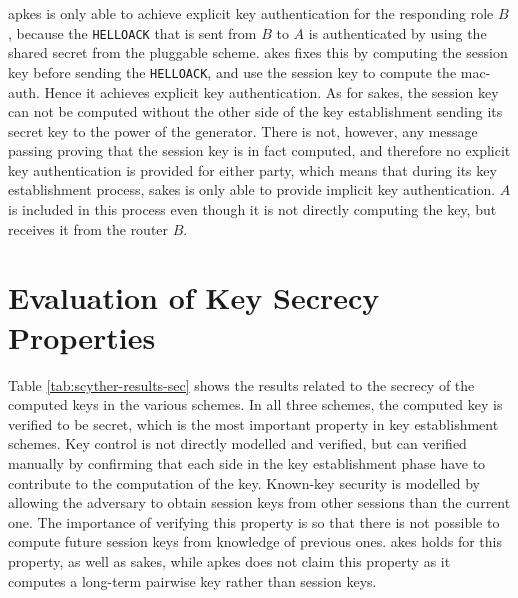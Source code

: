 \gls{apkes} is only able to achieve explicit key authentication for the responding role $B$, because the \texttt{HELLOACK} that is sent from $B$ to $A$ is authenticated by using the shared secret from the pluggable scheme. \gls{akes} fixes this by computing the session key before sending the \texttt{HELLOACK}, and use the session key to compute the \gls{mac-auth}. Hence it achieves explicit key authentication. As for \gls{sakes}, the session key can not be computed without the other side of the key establishment sending its secret key to the power of the generator. There is not, however, any message passing proving that the session key is in fact computed, and therefore no explicit key authentication is provided for either party, which means that during its key establishment process, \gls{sakes} is only able to provide implicit key authentication. $A$ is included in this process even though it is not directly computing the key, but receives it from the router $B$.

\section{Evaluation of Key Secrecy Properties}

Table \ref{tab:scyther-results-sec} shows the results related to the secrecy of the computed keys in the various schemes. In all three schemes, the computed key is verified to be secret, which is the most important property in key establishment schemes. Key control is not directly modelled and verified, but can verified manually by confirming that each side in the key establishment phase have to contribute to the computation of the key. Known-key security is modelled by allowing the adversary to obtain session keys from other sessions than the current one. The importance of verifying this property is so that there is not possible to compute future session keys from knowledge of previous ones. \gls{akes} holds for this property, as well as \gls{sakes}, while \gls{apkes} does not claim this property as it computes a long-term pairwise key rather than session keys.

\begin{table}[h]
\centering
{}
\caption{Table of the security properties for secrecy that are satisfied in the different protocols.}
\label{tab:scyther-results-sec}
\end{table}

